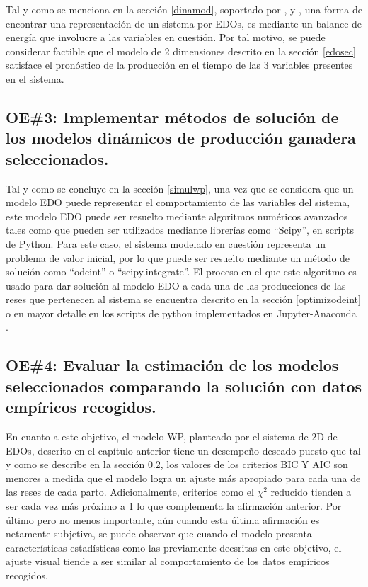 Tal y como se menciona en la sección \ref{dinamod}, soportado por \cite{shanks}, \cite{silvestre} y \cite{iran}, una forma de encontrar una representación de un sistema por EDOs, es mediante un balance de energía que involucre a las variables en cuestión. Por tal motivo, se puede considerar factible que el modelo de 2 dimensiones descrito en la sección \ref{edosec} satisface el pronóstico de la producción en el tiempo de las 3 variables presentes en el sistema.


\subsection{OE\#3: Implementar métodos de solución de los modelos dinámicos de producción ganadera seleccionados.}

Tal y como se concluye en la sección \ref{simulwp}, una vez que se considera que un modelo EDO puede representar el comportamiento de las variables del sistema, este modelo EDO puede ser resuelto mediante algoritmos numéricos avanzados tales como que pueden ser utilizados mediante librerías como ``Scipy'', en scripts de Python. Para este caso, el sistema modelado en cuestión representa un problema de valor inicial, por lo que puede ser resuelto mediante un método de solución como ``odeint'' o ``scipy.integrate''. El proceso en el que este algoritmo es usado para dar solución al modelo EDO a cada una de las producciones de las reses que pertenecen al sistema se encuentra descrito en la sección \ref{optimizodeint} o en mayor detalle en los scripts de python implementados en Jupyter-Anaconda \cite{msclfggrepo}.


\subsection{OE\#4: Evaluar la estimación de los modelos seleccionados comparando la solución con datos empíricos recogidos.} 

En cuanto a este objetivo, el modelo WP, planteado por el sistema de 2D de EDOs, descrito en el capítulo anterior tiene un desempeño deseado puesto que tal y como se describe en la sección \ref{}, los valores de los criterios BIC Y AIC son menores a medida que el modelo logra un ajuste más apropiado para cada una de las reses de cada parto. Adicionalmente, criterios como el $\chi^{2}$ reducido tienden a ser cada vez más próximo a 1 lo que complementa la afirmación anterior. Por último pero no menos importante, aún cuando esta última afirmación es netamente subjetiva, se puede observar que  cuando el modelo presenta características estadísticas como las previamente decsritas en este objetivo, el ajuste visual tiende a ser similar al comportamiento de los datos empíricos recogidos.



